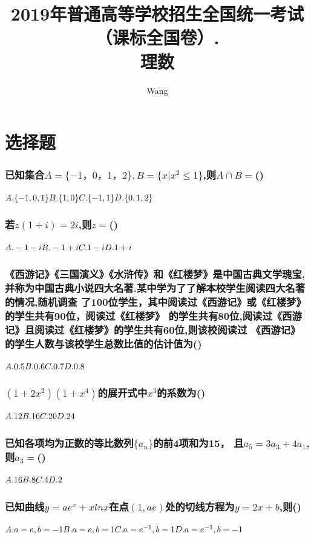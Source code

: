 \documentclass[UTF8]{ctexart}
\begin{document}
\title{2019年普通高等学校招生全国统一考试
    （课标全国卷\uppercase\expandafter{}）.\\
    \textbf{理数}}
\author{Wang}
\maketitle

\section{选择题}

\subsubsection{已知集合$A=\{-1，0，1，2\},B=\{x|x^2\leq 1\}$,则$A\cap B=$\hfill (\qquad)}
$A.\{-1,0,1\}\hfill B.\{1,0\}\hfill C.\{-1,1\}\hfill D.\{0,1,2\}$

\subsubsection{若$z(1+i)=2i$,则$z=$\hfill (\qquad)}
$A. -1-i\hfill B. -1+i\hfill C. 1-i\hfill D. 1+i$

\subsubsection{《西游记》《三国演义》《水浒传》和《红楼梦》是中国古典文学瑰宝,
    并称为中国古典小说四大名著.某中学为了了解本校学生阅读四大名著的情况,随机调查
    了100位学生，其中阅读过《西游记》或《红楼梦》的学生共有90位，阅读过《红楼梦》
    的学生共有80位,阅读过《西游记》且阅读过《红楼梦》的学生共有60位,则该校阅读过
    《西游记》的学生人数与该校学生总数比值的估计值为\hfill (\qquad)}
$A. 0.5\hfill B. 0.6\hfill C. 0.7\hfill D. 0.8$

\subsubsection{$(1+2x^2)(1+x^4)$的展开式中$x^3$的系数为\hfill (\qquad)}
$A. 12\hfill B. 16\hfill C. 20\hfill D. 24$

\subsubsection{已知各项均为正数的等比数列$\{a_n\}$的前4项和为15，
    且$a_5=3a_3+4a_1$,则$a_3=$\hfill (\qquad)}
$A. 16\hfill B. 8\hfill C. 4\hfill D. 2$

\subsubsection{已知曲线$y=ae^x+xlnx$在点$(1,ae)$处的切线方程为$y=2x+b$,则\hfill (\qquad)}
$A. a=e,b=-1 \hfill B. a=e,b=1\hfill C. a=e^{-1},b=1\hfill D. a=e^{-1},b=-1$
\end{document}
